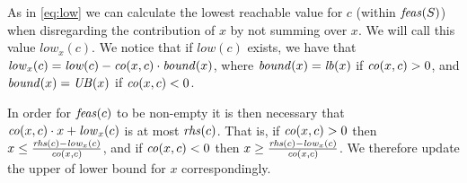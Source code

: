 As in \eqref{eq:low} we can calculate the lowest reachable value for $c$ (within $\mathit{feas}(S)$) when disregarding the contribution of $x$ by not summing over $x$. We will call this value $\mathit{low}_x(c)$. We notice that if $\mathit{low}(c)$ exists, we have that $\mathit{low}_x(c) = \mathit{low}(c) - \mathit{co}(x,c)\cdot \mathit{bound}(x)$, where $\mathit{bound}(x)=\mathit{lb}(x)$ if $\mathit{co}(x,c)>0$, and $\mathit{bound}(x)= \mathit{UB}(x)$ if $\mathit{co}(x,c)<0$.

In order for $\mathit{feas}(c)$ to be non-empty it is then necessary that 
	$\mathit{co}(x,c)\cdot x + \mathit{low}_x(c)$ is at most $\mathit{rhs}(c)$. 	
That is, if $\mathit{co}(x,c)>0$ then $x\leq \frac{\mathit{rhs}(c)-\mathit{low}_x(c)}{\mathit{co}(x,c)}$, and if $\mathit{co}(x,c)<0$ then $x\geq \frac{\mathit{rhs}(c)-\mathit{low}_x(c)}{\mathit{co}(x,c)}$. We therefore update the upper of lower bound for $x$ correspondingly.
	

